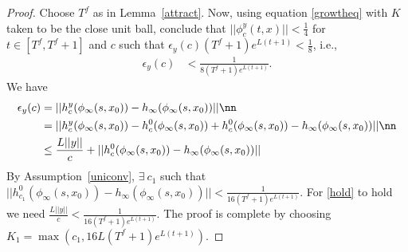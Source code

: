 \begin{proof}
Choose $T^f$ as in Lemma~\ref{attract}. Now, using equation \eqref{growtheq} with $K$ taken to be the close unit ball, conclude that $||\phi^y_c(t,x)||< \frac{1}{4}$ for $t \in [T^f,T^f+1]$ and $c$ such that $\epsilon_y(c)(T^f+1)e^{L(t+1)}<\frac{1}{8}$, i.e., 
\begin{align}\label{hold}
\epsilon_y(c)&<\frac{1}{8(T^f+1)e^{L(t+1)}}.
\end{align}
We have
\begin{align}
\epsilon_y(c)&=||h^y_c(\phi_\infty(s,x_0))-h_\infty(\phi_\infty(s,x_0))||\nn\\
	     &=||h^y_c(\phi_\infty(s,x_0)) - h^0_c(\phi_\infty(s,x_0)) + h^0_c(\phi_\infty(s,x_0)) -h_\infty(\phi_\infty(s,x_0))||\nn\\
	     &\leq \frac{L||y||}{c}+||h^0_c(\phi_\infty(s,x_0))-h_\infty(\phi_\infty(s,x_0))||
\end{align}
By Assumption~\ref{uniconv}, $\exists~c_1$ such that $||h^0_{c_1}(\phi_\infty(s,x_0))-h_\infty(\phi_\infty(s,x_0))||< \frac{1}{16(T^f+1)e^{L(t+1)}}$. For \eqref{hold} to hold we need $\frac{L||y||}{c}<\frac{1}{16(T^f+1)e^{L(t+1)}}$. The proof is complete by choosing $K_1=\max(c_1,16L(T^f+1)e^{L(t+1)})$.
\end{proof}
